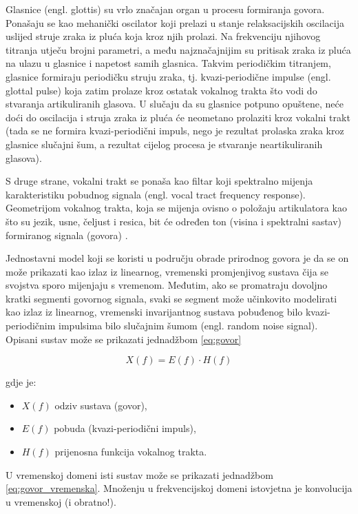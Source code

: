 Glasnice (engl. glottis) su vrlo značajan organ u procesu formiranja govora. 
Ponašaju se kao mehanički
oscilator koji prelazi u stanje relaksacijskih oscilacija uslijed struje zraka iz pluća koja kroz njih
prolazi. Na frekvenciju njihovog titranja utječu brojni parametri, a među najznačajnijim su
pritisak zraka iz pluća na ulazu u glasnice i napetost samih glasnica.
Takvim periodičkim titranjem, glasnice formiraju periodičku struju zraka, tj. 
kvazi-periodične impulse (engl. glottal pulse) koja zatim prolaze kroz ostatak 
vokalnog trakta što vodi do stvaranja artikuliranih glasova. U slučaju da 
su glasnice potpuno opuštene, neće
doći do oscilacija i struja zraka iz pluća će neometano prolaziti kroz vokalni trakt 
(tada se ne formira kvazi-periodični impuls, nego je rezultat prolaska zraka kroz glasnice
slučajni šum, a rezultat cijelog procesa je stvaranje neartikuliranih glasova). 

S druge strane, vokalni trakt se ponaša kao filtar koji spektralno mijenja karakteristiku
pobudnog signala (engl. vocal tract frequency response). 
Geometrijom vokalnog trakta, koja se mijenja ovisno o položaju 
artikulatora kao što su jezik, usne, čeljust i resica, bit će određen ton (visina i
spektralni sastav) formiranog signala (govora) \cite{petrinovic2002}. 

Jednostavni model koji se koristi u području obrade prirodnog govora je da se on 
može prikazati kao izlaz iz linearnog, vremenski promjenjivog sustava čija se 
svojstva sporo mijenjaju s vremenom. Međutim, ako se promatraju dovoljno kratki
segmenti govornog signala, svaki se segment može učinkovito modelirati kao izlaz
iz linearnog, vremenski invarijantnog sustava pobuđenog bilo
kvazi-periodičnim impulsima bilo slučajnim šumom (engl. random noise signal).
Opisani sustav može se prikazati jednadžbom \ref{eq:govor}

\begin{equation}
    \label{eq:govor}
    X(f) = E(f) \cdot H(f)
\end{equation}

gdje je:
\begin{itemize}
    \item \(X(f)\) odziv sustava (govor),
    \item \(E(f)\) pobuda (kvazi-periodični impuls),
    \item \(H(f)\) prijenosna funkcija vokalnog trakta.
\end{itemize}

U vremenskoj domeni isti sustav može se prikazati jednadžbom \ref{eq:govor_vremenska}.
Množenju u frekvencijskoj domeni istovjetna je konvolucija u vremenskoj (i obratno!).

